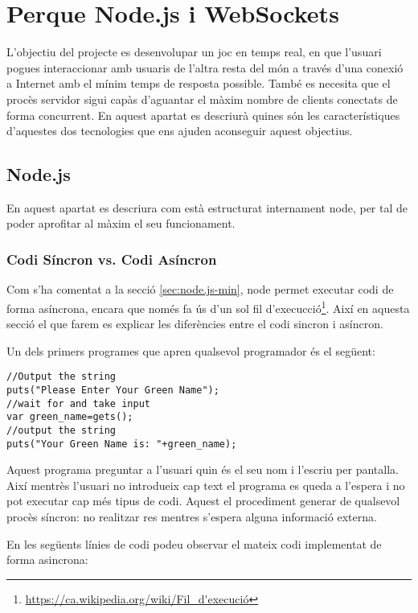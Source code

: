 \chapter{Perque Node.js i WebSockets}

L'objectiu del projecte es desenvolupar un joc en temps real, en que l'usuari pogues interaccionar amb usuaris de l'altra resta del món a través d'una conexió a Internet amb el mínim temps de resposta possible. També es necesita que el procès servidor sigui capàs d'aguantar el màxim nombre de clients conectats de forma concurrent. En aquest apartat es descriurà quines són les característiques d'aquestes dos tecnologies que ens ajuden aconseguir aquest objectius.

\section{Node.js}
\label{sec:node.js-full}

En aquest apartat es descriura com està estructurat internament node, per tal de poder aprofitar al màxim el seu funcionament. 

\subsection{Codi Síncron vs. Codi Asíncron}

Com s'ha comentat a la secció \ref{sec:node.js-min}, node permet executar codi de forma asíncrona, encara que només fa ús d'un sol fil d'execucció\footnote{\url{https://ca.wikipedia.org/wiki/Fil_d'execució}}. Així en aquesta secció el que farem es explicar les diferències entre el codi sincron i asíncron.

Un dels primers programes que apren qualsevol programador és el següent:

\begin{lstlisting}
//Output the string
puts("Please Enter Your Green Name");
//wait for and take input
var green_name=gets();
//output the string
puts("Your Green Name is: "+green_name);
\end{lstlisting}

Aquest programa preguntar a l'usuari quin és el seu nom i l'escriu per pantalla. Així mentrès l'usuari no introdueix cap text el programa es queda a l'espera i no pot executar cap més tipus de codi. Aquest el procediment generar de qualsevol procès síncron: no realitzar res mentres s'espera alguna informació externa.

En les següents línies de codi podeu observar el mateix codi implementat de forma asincrona:
	
